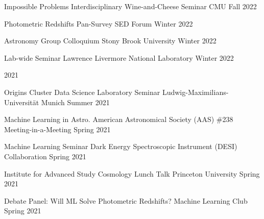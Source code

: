 \documentclass[11pt,letterpaper]{article}
\begin{document}
\begin{list}{}{\malzlist}
\begin{list}{}{\malzlist}
		{Impossible Problems Interdisciplinary Wine-and-Cheese Seminar}
		{CMU}
		{Fall 2022}
		\item {}
		{Photometric Redshifts}
		{Pan-Survey SED Forum}
		{Winter 2022}
		\item {}
		{Astronomy Group Colloquium}
		{Stony Brook University}
		{Winter 2022}
		\item {}
		{Lab-wide Seminar}
		{Lawrence Livermore National Laboratory}
		{Winter 2022}
	\end{list}
		\item 2021
		\nopagebreak\begin{list}{}{\malzlist}
			\item {}
			{Origins Cluster Data Science Laboratory Seminar}
			{Ludwig-Maximilians-Universit{\"a}t Munich}%
		{Summer 2021}
		\item {}
		{Machine Learning in Astro.}%
	{American Astronomical Society (AAS) \#238 Meeting-in-a-Meeting}
	{Spring 2021}
	\item {}
	{Machine Learning Seminar}
	{Dark Energy Spectroscopic Instrument (DESI) Collaboration}
	{Spring 2021}
	\item {}
	{Institute for Advanced Study Cosmology Lunch Talk}
	{Princeton University}
	{Spring 2021}
	\item {}
	{Debate Panel: Will ML Solve Photometric Redshifts?}
	{Machine Learning Club}
	{Spring 2021}
\end{list}

\end{list}
\end{document}
